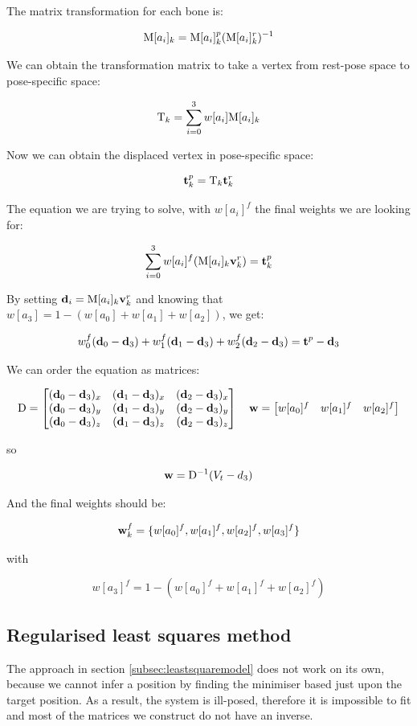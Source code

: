 \documentclass[12pt,twoside]{report}
\begin{document}
The matrix transformation for each bone is:

\[\mathrm{M}[a_i]_k = \mathrm{M}[a_i]_k^p (\mathrm{M}[a_i]_k^r)^{-1}\]

We can obtain the transformation matrix to take a vertex from rest-pose space to pose-specific space:

\[\mathrm{T}_k = \sum\limits_{i=0}^3 w[a_i] \mathrm{M}[a_i]_k\]

Now we can obtain the displaced vertex in pose-specific space:

\[\boldsymbol{ \mathrm{t} }_k^p = \mathrm{T}_k \boldsymbol{ \mathrm{t} }_k^r\]

The equation we are trying to solve, with $w[a_i]^f$ the final weights we are looking for:

\[\sum\limits_{i=0}^3 w[a_i]^f(\mathrm{M}[a_i]_k \boldsymbol{ \mathrm{v} }_k^r) = \boldsymbol{ \mathrm{t} }_k^p\]

By setting $\boldsymbol{ \mathrm{d} }_i = \mathrm{M}[a_i]_k \boldsymbol{ \mathrm{v} }_k^r$ and knowing that $w[a_3]=1 - (w[a_0] + w[a_1] + w[a_2])$, we get:

\[w_0^f(\boldsymbol{ \mathrm{d} }_0-\boldsymbol{ \mathrm{d} }_3) + w_1^f(\boldsymbol{ \mathrm{d} }_1-\boldsymbol{ \mathrm{d} }_3) + w_2^f(\boldsymbol{ \mathrm{d} }_2-\boldsymbol{ \mathrm{d} }_3) = \boldsymbol{ \mathrm{t} }^p - \boldsymbol{ \mathrm{d} }_3\]

We can order the equation as matrices:

\begin{equation*}
\mathrm{D}=
\begin{bmatrix} 
(\boldsymbol{ \mathrm{d} }_0-\boldsymbol{ \mathrm{d} }_3)_x & (\boldsymbol{ \mathrm{d} }_1-\boldsymbol{ \mathrm{d} }_3)_x & (\boldsymbol{ \mathrm{d} }_2-\boldsymbol{ \mathrm{d} }_3)_x \\
(\boldsymbol{ \mathrm{d} }_0-\boldsymbol{ \mathrm{d} }_3)_y & (\boldsymbol{ \mathrm{d} }_1-\boldsymbol{ \mathrm{d} }_3)_y & (\boldsymbol{ \mathrm{d} }_2-\boldsymbol{ \mathrm{d} }_3)_y \\
(\boldsymbol{ \mathrm{d} }_0-\boldsymbol{ \mathrm{d} }_3)_z & (\boldsymbol{ \mathrm{d} }_1-\boldsymbol{ \mathrm{d} }_3)_z & (\boldsymbol{ \mathrm{d} }_2-\boldsymbol{ \mathrm{d} }_3)_z
\end{bmatrix}
\quad
\boldsymbol{ \mathrm{w} } =
\begin{bmatrix}
w[a_0]^f & w[a_1]^f & w[a_2]^f
\end{bmatrix}
\end{equation*}

so

\[\boldsymbol{ \mathrm{w} }=\mathrm{D}^{-1}(V_t-d_3)\]

And the final weights should be:

\[\boldsymbol{ \mathrm{w} }_k^f = \{w[a_0]^f, w[a_1]^f, w[a_2]^f, w[a_3]^f\}\]

with

\[w[a_3]^f=1 - (w[a_0]^f + w[a_1]^f + w[a_2]^f)\]

\subsection{Regularised least squares method}
\label{subsec:regleastsqmmodel}
The approach in section \ref{subsec:leastsquaremodel} does not work on its own, because we cannot infer a position by finding the minimiser based just upon the target position. As a result, the system is ill-posed, therefore it is impossible to fit and most of the matrices we construct do not have an inverse.
\end{document}
